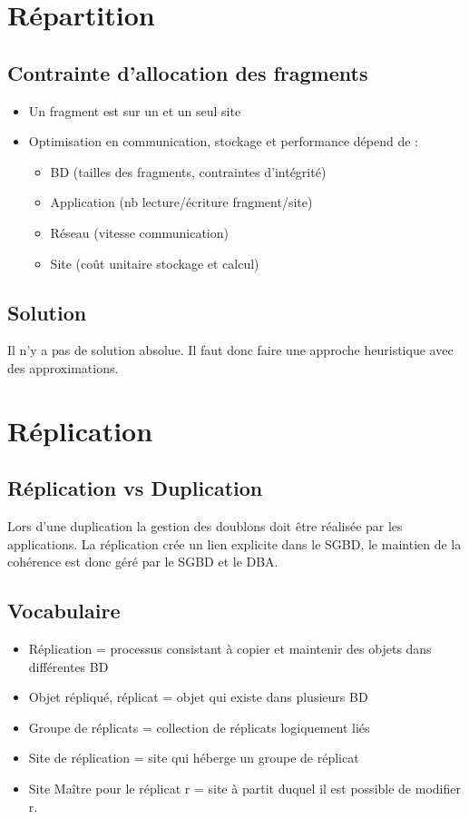 \documentclass[10pt,a4paper,twoside]{article}
\begin{document}
\section{Répartition}
\subsection{Contrainte d'allocation des fragments}
\begin{itemize}
\item Un fragment est sur un et un seul site
\item Optimisation en communication, stockage et performance dépend de :
\begin{itemize}
\item BD (tailles des fragments, contraintes d'intégrité)
\item Application (nb lecture/écriture fragment/site)
\item Réseau (vitesse communication)
\item Site (coût unitaire stockage et calcul)
\end{itemize}
\end{itemize}
\subsection{Solution}
Il n'y a pas de solution absolue. Il faut donc faire une approche heuristique avec des approximations.

\section{Réplication}
\subsection*{Réplication vs Duplication}
Lors d'une duplication la gestion des doublons doit être réalisée par les applications. La réplication crée un lien explicite dans le SGBD, le maintien de la cohérence est donc géré par le SGBD et le DBA.

\subsection{Vocabulaire}
\begin{itemize}
\item Réplication = processus consistant à copier et maintenir des  objets dans différentes BD
\item Objet répliqué, réplicat = objet qui existe dans plusieurs BD
\item Groupe de réplicats = collection de réplicats logiquement liés
\item Site de réplication = site qui héberge un groupe de réplicat
\item Site Maître pour le réplicat r = site à partit duquel il est possible de modifier r.
\end{itemize}
\end{document}
